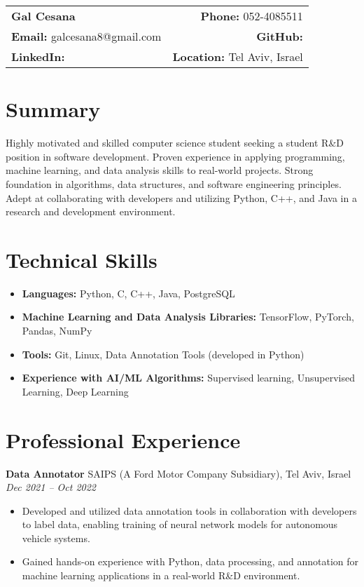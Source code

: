 \documentclass[a4paper,10pt]{article}
\makeatletter
\renewcommand{\maketitle}{
    \hspace{-1em}\begin{tabular*}{\textwidth}{l@{\extracolsep{\fill}}r}
        \textbf{\LARGE Gal Cesana} & \textbf{Phone:} 052-4085511 \\
        \textbf{Email:} galcesana8@gmail.com & \textbf{GitHub:} \\
        \textbf{LinkedIn:}  & \textbf{Location:} Tel Aviv, Israel \\
    \end{tabular*}
    \vspace{1em}
}
\makeatother
\begin{document}
\maketitle

\section*{Summary}
Highly motivated and skilled computer science student seeking a student R\&D position in software development. Proven experience in applying programming, machine learning, and data analysis skills to real-world projects. Strong foundation in algorithms, data structures, and software engineering principles. Adept at collaborating with developers and utilizing Python, C++, and Java in a research and development environment.

\section*{Technical Skills}
\begin{itemize}[noitemsep,nolistsep]
    \item \textbf{Languages:} Python, C, C++, Java, PostgreSQL
    \item \textbf{Machine Learning and Data Analysis Libraries:} TensorFlow, PyTorch, Pandas, NumPy
    \item \textbf{Tools:} Git, Linux, Data Annotation Tools (developed in Python)
    \item \textbf{Experience with AI/ML Algorithms:}  Supervised learning, Unsupervised Learning, Deep Learning 
\end{itemize}

\section*{Professional Experience}
\textbf{Data Annotator} \hfill SAIPS (A Ford Motor Company Subsidiary), Tel Aviv, Israel \\
\textit{Dec 2021 -- Oct 2022}
\begin{itemize}[noitemsep,nolistsep]
    \item Developed and utilized data annotation tools in collaboration with developers to label data, enabling training of neural network models for autonomous vehicle systems. 
    \item Gained hands-on experience with Python, data processing, and annotation for machine learning applications in a real-world R\&D environment.
\end{itemize}
\end{document}
